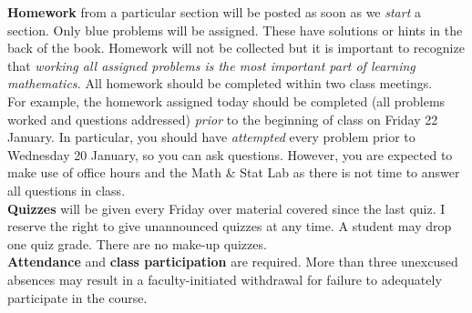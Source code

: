 \documentclass[11pt]{article}
\begin{document}
\textbf{Homework} from a particular section will be posted as soon as we {\it{start}} a section. Only blue problems will be assigned. These have solutions or hints in the back of the book. Homework will not be collected but it is important to recognize that {\it{working all assigned problems  is the most important part of learning mathematics}.} All homework should be completed within two class meetings. \\

For example, the homework assigned today should be completed (all problems worked and questions addressed) \emph{prior} to the beginning of class on Friday 22 January. In particular, you should have \emph{attempted} every problem prior to Wednesday 20 January, so you can ask questions. However, you are expected to make use of office hours and the Math \& Stat Lab as there is not time to answer all questions in class.\\

\textbf{Quizzes} will be given every Friday over material covered since the last quiz. I reserve the right to give unannounced quizzes at any time. A student may drop one quiz grade. There are no make-up quizzes.\\

\textbf{Attendance} and \textbf{class participation} are required. More than three unexcused absences may result in a faculty-initiated withdrawal for failure to adequately participate in the course.\\
\end{document}
